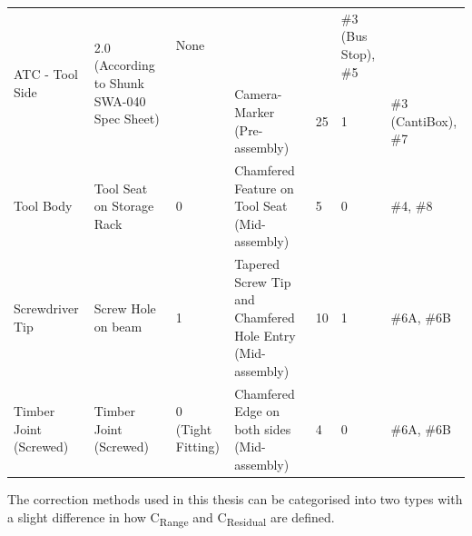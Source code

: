 \documentclass[11pt]{book}
\begin{document}
\begin{table}[H]
\begin{adjustbox}{max width=\textwidth}
\begin{tabular}{p{2.25cm}p{2.2cm}p{2.62cm}p{4.1cm}p{1.19cm}p{1.35cm}p{2.25cm}}
\multicolumn{1}{|p{2.2cm}}{\multirow{2}{*}{\parbox{2.2cm}{{\scriptsize ATC - Tool Side }}}} & 
\multicolumn{1}{|p{2.62cm}}{\multirow{2}{*}{\parbox{2.62cm}{{\scriptsize 2.0 (According to Shunk SWA-040 Spec Sheet)}}}} & 
\multicolumn{1}{|p{4.1cm}}{{\scriptsize None}} & 
\multicolumn{1}{|p{1.19cm}}{} & 
\multicolumn{1}{|p{1.35cm}}{} & 
\multicolumn{1}{|p{2.25cm}|}{{\scriptsize $\#$3 (Bus Stop), $\#$5}} \\ 
\hhline{~~~----}
\multicolumn{1}{|p{2.25cm}}{} & 
\multicolumn{1}{|p{2.2cm}}{} & 
\multicolumn{1}{|p{2.62cm}}{} & 
\multicolumn{1}{|p{4.1cm}}{{\scriptsize Camera-Marker} \newline
{\scriptsize (Pre-assembly)}} & 
\multicolumn{1}{|p{1.19cm}}{{\scriptsize 25}} & 
\multicolumn{1}{|p{1.35cm}}{{\scriptsize 1}} & 
\multicolumn{1}{|p{2.25cm}|}{{\scriptsize $\#$3 (CantiBox), $\#$7}} \\ 
\hline
\multicolumn{1}{|p{2.25cm}}{{\scriptsize Tool Body}} & 
\multicolumn{1}{|p{2.2cm}}{{\scriptsize Tool Seat on Storage Rack}} & 
\multicolumn{1}{|p{2.62cm}}{{\scriptsize 0}} & 
\multicolumn{1}{|p{4.1cm}}{{\scriptsize Chamfered Feature on Tool Seat} \newline
{\scriptsize (Mid-assembly)}} & 
\multicolumn{1}{|p{1.19cm}}{{\scriptsize 5}} & 
\multicolumn{1}{|p{1.35cm}}{{\scriptsize 0}} & 
\multicolumn{1}{|p{2.25cm}|}{{\scriptsize $\#$4, $\#$8}} \\ 
\hline
\multicolumn{1}{|p{2.25cm}}{{\scriptsize Screwdriver Tip}} & 
\multicolumn{1}{|p{2.2cm}}{{\scriptsize Screw Hole on beam}} & 
\multicolumn{1}{|p{2.62cm}}{{\scriptsize 1}} & 
\multicolumn{1}{|p{4.1cm}}{{\scriptsize Tapered Screw Tip and Chamfered Hole Entry} \newline
{\scriptsize (Mid-assembly)}} & 
\multicolumn{1}{|p{1.19cm}}{{\scriptsize 10}} & 
\multicolumn{1}{|p{1.35cm}}{{\scriptsize 1}} & 
\multicolumn{1}{|p{2.25cm}|}{{\scriptsize $\#$6A, $\#$6B}} \\ 
\hline
\multicolumn{1}{|p{2.25cm}}{{\scriptsize Timber Joint (Screwed)}} & 
\multicolumn{1}{|p{2.2cm}}{{\scriptsize Timber Joint (Screwed)}} & 
\multicolumn{1}{|p{2.62cm}}{{\scriptsize 0 (Tight Fitting)}} & 
\multicolumn{1}{|p{4.1cm}}{{\scriptsize Chamfered Edge on both sides} \newline
{\scriptsize (Mid-assembly)}} & 
\multicolumn{1}{|p{1.19cm}}{{\scriptsize 4}} & 
\multicolumn{1}{|p{1.35cm}}{{\scriptsize 0}} & 
\multicolumn{1}{|p{2.25cm}|}{{\scriptsize $\#$6A, $\#$6B}} \\ 
\hline
\end{tabular}
\end{adjustbox}
\end{table}
\vspace{9\baselineskip}
The correction methods used in this thesis can be categorised into two types with a slight difference in how C\textsubscript{Range} and C\textsubscript{Residual} are defined.
\end{document}

